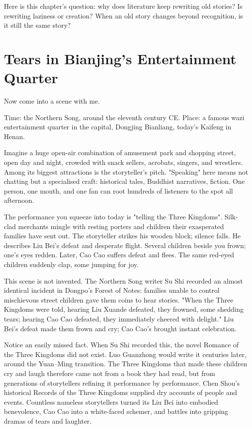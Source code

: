 Here is this chapter's question: why does literature keep rewriting old stories? Is rewriting laziness or creation? When an old story changes beyond recognition, is it still the same story?

\section{Tears in Bianjing's Entertainment Quarter}
Now come into a scene with me.

Time: the Northern Song, around the eleventh century CE. Place: a famous wazi entertainment quarter in the capital, Dongjing Bianliang, today's Kaifeng in Henan.

Imagine a huge open-air combination of amusement park and shopping street, open day and night, crowded with snack sellers, acrobats, singers, and wrestlers. Among its biggest attractions is the storyteller's pitch. "Speaking" here means not chatting but a specialised craft: historical tales, Buddhist narratives, fiction. One person, one mouth, and one fan can root hundreds of listeners to the spot all afternoon.

The performance you squeeze into today is "telling the Three Kingdoms". Silk-clad merchants mingle with resting porters and children their exasperated families have sent out. The storyteller strikes his wooden block; silence falls. He describes Liu Bei's defeat and desperate flight. Several children beside you frown; one's eyes redden. Later, Cao Cao suffers defeat and flees. The same red-eyed children suddenly clap, some jumping for joy.

This scene is not invented. The Northern Song writer Su Shi recorded an almost identical incident in Dongpo's Forest of Notes: families unable to control mischievous street children gave them coins to hear stories. "When the Three Kingdoms were told, hearing Liu Xuande defeated, they frowned, some shedding tears; hearing Cao Cao defeated, they immediately cheered with delight." Liu Bei's defeat made them frown and cry; Cao Cao's brought instant celebration.

Notice an easily missed fact. When Su Shi recorded this, the novel Romance of the Three Kingdoms did not exist. Luo Guanzhong would write it centuries later, around the Yuan--Ming transition. The Three Kingdoms that made these children cry and laugh therefore came not from a book they had read, but from generations of storytellers refining it performance by performance. Chen Shou's historical Records of the Three Kingdoms supplied dry accounts of people and events. Countless nameless storytellers turned its Liu Bei into embodied benevolence, Cao Cao into a white-faced schemer, and battles into gripping dramas of tears and laughter.

